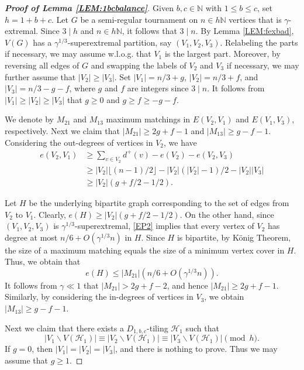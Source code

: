 \documentclass[11pt,a4paper,reqno]{amsart}
\theoremstyle{definition} %
\begin{document}
\begin{proof}[\textbf{Proof of Lemma \ref{LEM:1bcbalance}}] 
Given $b,c\in\mathbb{N}$ with $1\leqslant b\leqslant c$, set 
$h=1+b+c$. Let $G$ be a semi-regular tournament on $n\in h\mathbb{N}$ vertices that is $\gamma$-extremal. Since $3\mid h$ and $n\in h\mathbb{N}$, it follows that $3\mid n$. By Lemma \ref{LEM:fexbad}, $V(G)$ has a $\gamma^{1/3}$-superextremal partition, say $(V_1,V_2,V_3)$. Relabeling the parts if necessary, we may assume w.l.o.g. that $V_1$ is the largest part. Moreover, by reversing all edges of $G$ and swapping the labels of $V_2$ and $V_3$ if necessary, we may further assume that $|V_2|\geqslant |V_3|$. Set $|V_1|=n/3+g$, $|V_2|=n/3+f$, and $|V_3|=n/3-g-f$, where $g$ and $f$ are integers since $3\mid n$. It follows from $|V_1|\geqslant |V_2|\geqslant |V_3|$ that $g\geqslant 0$ and $g\geqslant f\geqslant -g-f$.

We denote by $M_{21}$ and $M_{13}$ maximum matchings in $E(V_2,V_1)$ and $E(V_1,V_3)$, respectively. Next we claim that $|M_{21}|\geqslant 2g+f-1$ and $|M_{13}|\geqslant g-f-1$. Considering the out-degrees of vertices in $V_2$, we have 
\begin{align*}
    e(V_2,V_1)&\geqslant \sum_{v\in V_2} d^+(v)-e(V_2)-e(V_2,V_3)\\
    &\geqslant |V_2|\lfloor (n-1)/2\rfloor-|V_2|(|V_2|-1)/2-|V_2||V_3|\\
    &\geqslant |V_2|(g+f/2-1/2).
\end{align*}

Let $H$ be the underlying bipartite graph corresponding to the set of edges from $V_2$ to $V_1$. Clearly, $e(H)\geqslant|V_2|(g+f/2-1/2)$. On the other hand, since $(V_1,V_2,V_3)$ is $\gamma^{1/3}$-superextremal, \ref{EP2} implies that every vertex of $V_2$ has degree at most $n/6 + O(\gamma^{1/3}n)$ in $H$. Since $H$ is bipartite, by K\"{o}nig Theorem, the size of a maximum matching equals the size of a minimum vertex cover in $H$. Thus, we obtain that
$$
e(H)\leqslant |M_{21}|(n/6 + O(\gamma^{1/3}n)).
$$
It follows from $\gamma\ll 1$ that $|M_{21}|>2g+f-2$, and hence $|M_{21}|\geqslant 2g+f-1$. Similarly, by considering the in-degrees of vertices in $V_3$, we obtain $|M_{13}|\geqslant g-f-1$.

Next we claim that there exists a $D_{1,b,c}$-tiling $\mathcal{H}_1$ such that
$$
|V_1\backslash V(\mathcal{H}_1)|\equiv|V_2\backslash V(\mathcal{H}_1)|\equiv|V_3\backslash V(\mathcal{H}_1)|\pmod h.
$$
If $g=0$, then $|V_1|=|V_2|=|V_3|$, and there is nothing to prove. Thus we may assume that $g\geqslant 1$. 


\end{proof}
\end{document}
